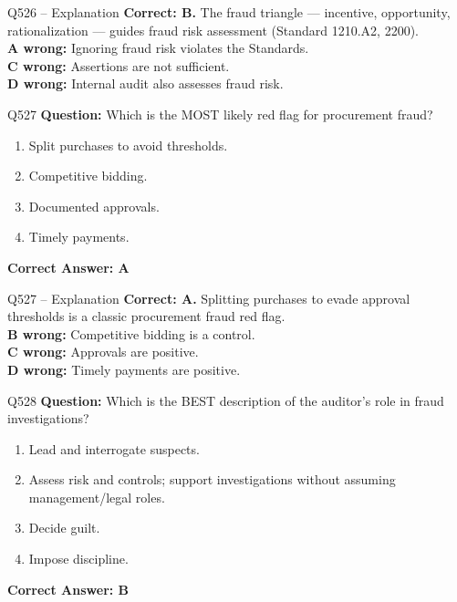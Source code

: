 \documentclass[aspectratio=169,10pt]{beamer}
\begin{document}
	\begin{frame}[t]{Q526 -- Explanation}
		\small
		\textbf{Correct: B.} The fraud triangle — incentive, opportunity, rationalization — guides fraud risk assessment (Standard 1210.A2, 2200). \\[4pt]
		\textbf{A wrong:} Ignoring fraud risk violates the Standards. \\[2pt]
		\textbf{C wrong:} Assertions are not sufficient. \\[2pt]
		\textbf{D wrong:} Internal audit also assesses fraud risk.
	\end{frame}
	
	\begin{frame}[t]{Q527}
		\small
		\textbf{Question:} Which is the MOST likely red flag for procurement fraud?
		\begin{enumerate}[label=\Alph*.,itemsep=1pt,topsep=2pt]
			\item Split purchases to avoid thresholds.
			\item Competitive bidding.
			\item Documented approvals.
			\item Timely payments.
		\end{enumerate}
		\vspace{4pt}
		\textbf{Correct Answer: A}
	\end{frame}
	
	\begin{frame}[t]{Q527 -- Explanation}
		\small
		\textbf{Correct: A.} Splitting purchases to evade approval thresholds is a classic procurement fraud red flag. \\[4pt]
		\textbf{B wrong:} Competitive bidding is a control. \\[2pt]
		\textbf{C wrong:} Approvals are positive. \\[2pt]
		\textbf{D wrong:} Timely payments are positive.
	\end{frame}
	
	\begin{frame}[t]{Q528}
		\small
		\textbf{Question:} Which is the BEST description of the auditor's role in fraud investigations?
		\begin{enumerate}[label=\Alph*.,itemsep=1pt,topsep=2pt]
			\item Lead and interrogate suspects.
			\item Assess risk and controls; support investigations without assuming management/legal roles.
			\item Decide guilt.
			\item Impose discipline.
		\end{enumerate}
		\vspace{4pt}
		\textbf{Correct Answer: B}
	\end{frame}
	
\end{document}

